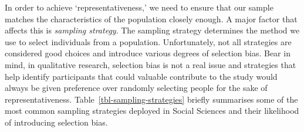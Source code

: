 \documentclass[
  letterpaper,
]{krantz}
\begin{document}
In order to achieve `representativeness,' we need to ensure that our
sample matches the characteristics of the population closely enough. A
major factor that affects this is \emph{sampling strategy}. The sampling
strategy determines the method we use to select individuals from a
population. Unfortunately, not all strategies are considered good
choices and introduce various degrees of selection bias. Bear in mind,
in qualitative research, selection bias is not a real issue and
strategies that help identify participants that could valuable
contribute to the study would always be given preference over randomly
selecting people for the sake of representativeness.
Table~\ref{tbl-sampling-strategies} briefly summarises some of the most
common sampling strategies deployed in Social Sciences and their
likelihood of introducing selection bias.
\end{document}
